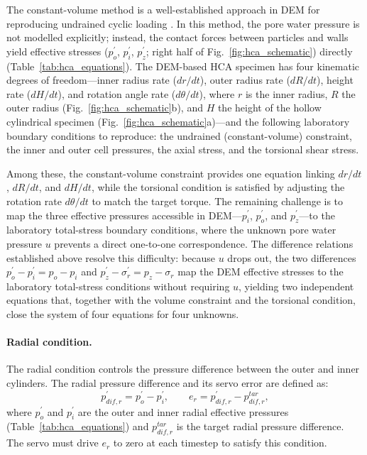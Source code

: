 \documentclass[a4paper,fleqn]{cas-sc}
\begin{document}
The constant-volume method is a well-established approach in DEM for reproducing undrained cyclic loading \citep{YimsiriSoga2010}. In this method, the pore water pressure is not modelled explicitly; instead, the contact forces between particles and walls yield effective stresses ($p_o^{\prime}$, $p_i^{\prime}$, $p_z^{\prime}$; right half of Fig.~\ref{fig:hca_schematic}) directly (Table~\ref{tab:hca_equations}). The DEM-based HCA specimen has four kinematic degrees of freedom---inner radius rate ($dr/dt$), outer radius rate ($dR/dt$), height rate ($dH/dt$), and rotation angle rate ($d\theta/dt$), where $r$ is the inner radius, $R$ the outer radius (Fig.~\ref{fig:hca_schematic}b), and $H$ the height of the hollow cylindrical specimen (Fig.~\ref{fig:hca_schematic}a)---and the following laboratory boundary conditions to reproduce: the undrained (constant-volume) constraint, the inner and outer cell pressures, the axial stress, and the torsional shear stress.

Among these, the constant-volume constraint provides one equation linking $dr/dt$, $dR/dt$, and $dH/dt$, while the torsional condition is satisfied by adjusting the rotation rate $d\theta/dt$ to match the target torque. The remaining challenge is to map the three effective pressures accessible in DEM---$p_i^{\prime}$, $p_o^{\prime}$, and $p_z^{\prime}$---to the laboratory total-stress boundary conditions, where the unknown pore water pressure $u$ prevents a direct one-to-one correspondence. The difference relations established above resolve this difficulty: because $u$ drops out, the two differences $p_o^{\prime}-p_i^{\prime}=p_o-p_i$ and $p_z^{\prime}-\sigma_r^{\prime}=p_z-\sigma_r$ map the DEM effective stresses to the laboratory total-stress conditions without requiring $u$, yielding two independent equations that, together with the volume constraint and the torsional condition, close the system of four equations for four unknowns.

\paragraph{Radial condition.}
The radial condition controls the pressure difference between the outer and inner cylinders. The radial pressure difference and its servo error are defined as:
\begin{equation}
p_{dif,r}^{\prime} = p_o^{\prime} - p_i^{\prime}, \qquad e_r = p_{dif,r}^{\prime} - p_{dif,r}^{tar},
\label{eq:cond1_radial}
\end{equation}
where $p_o^{\prime}$ and $p_i^{\prime}$ are the outer and inner radial effective pressures (Table~\ref{tab:hca_equations}) and $p_{dif,r}^{tar}$ is the target radial pressure difference. The servo must drive $e_r$ to zero at each timestep to satisfy this condition.
\end{document}
